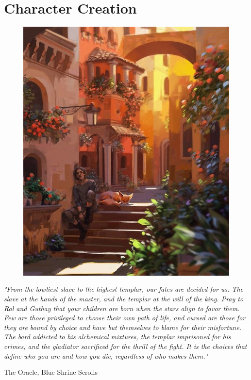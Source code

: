 \chapter{Character Creation}\label{chap:creation}

\begin{figure}[!htb]
\centering
\includegraphics[width=0.7\linewidth]{images/idilic.png}
\end{figure}

\epigraph{\textit{
    "From the lowliest slave to the highest templar, our fates are decided for us. The slave at the hands of the master, and the
    templar at the will of the king. Pray to Ral and Guthay that your children are born when the stars align to favor them.
    Few are those privileged to choose their own path of life, and cursed are those for they are bound by choice and have but
    themselves to blame for their misfortune. The bard addicted to his alchemical mixtures, the templar imprisoned for his
    crimes, and the gladiator sacrificed for the thrill of the fight. It is the choices that define who you are and how you die,
    regardless of who makes them." } } { The Oracle, Blue Shrine Scrolls }

